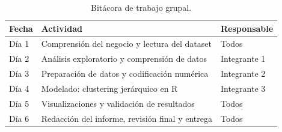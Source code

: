 \documentclass[10pt,a4paper]{article}
\begin{document}
\begin{table}[H]
  \centering
  \footnotesize
  \caption{Bitácora de trabajo grupal.}
  \label{tab:bitacora}
  \begin{tabularx}{\textwidth}{l X l}
    \toprule
    \textbf{Fecha} & \textbf{Actividad} & \textbf{Responsable} \\
    \midrule
    Día 1 & Comprensión del negocio y lectura del dataset           & Todos \\
    Día 2 & Análisis exploratorio y comprensión de datos            & Integrante 1 \\
    Día 3 & Preparación de datos y codificación numérica            & Integrante 2 \\
    Día 4 & Modelado: clustering jerárquico en R                    & Integrante 3 \\
    Día 5 & Visualizaciones y validación de resultados               & Todos \\
    Día 6 & Redacción del informe, revisión final y entrega         & Todos \\
    \bottomrule
  \end{tabularx}
\end{table}
\end{document}
